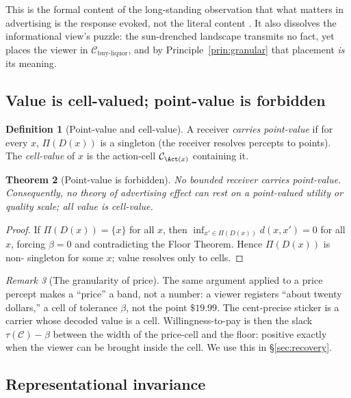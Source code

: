 \documentclass[twocolumn,11pt,a4paper]{article}
\theoremstyle{adv}
\newtheorem{theorem}{Theorem}[section]
\theoremstyle{definition}
\newtheorem{definition}[theorem]{Definition}
\theoremstyle{remark}
\newtheorem{remark}[theorem]{Remark}
\newcommand{\Cell}{\mathcal{C}}        %
\newcommand{\Dec}{D}                   %
\newcommand{\Proj}{\Pi}                %
\newcommand{\floor}{\beta}            %
\newcommand{\tol}{\tau}               %
\newcommand{\dist}{d}
\begin{document}
This is the formal content of the long-standing observation that what
matters in advertising is the response evoked, not the literal content
\citep{krugman1965,vakratsas1999}. It also dissolves the informational
view's puzzle: the sun-drenched landscape transmits no fact, yet places
the viewer in $\Cell_{\text{buy-liquor}}$, and by
Principle~\ref{prin:granular} that placement \emph{is} its meaning.

\subsection{Value is cell-valued; point-value is forbidden}

\begin{definition}[Point-value and cell-value]
\label{def:pointvalue}
A receiver \emph{carries point-value} if for every $x$, $\Proj(\Dec(x))$
is a singleton (the receiver resolves percepts to points). The
\emph{cell-value} of $x$ is the action-cell $\Cell_{\Act(x)}$ containing
it.
\end{definition}

\begin{theorem}[Point-value is forbidden]
\label{thm:nopoint}
No bounded receiver carries point-value. Consequently, no theory of
advertising effect can rest on a point-valued utility or quality scale;
all value is cell-value.
\end{theorem}

\begin{proof}
If $\Proj(\Dec(x))=\{x\}$ for all $x$, then
$\inf_{x'\in\Proj(\Dec(x))}\dist(x,x')=0$ for all $x$, forcing $\floor=0$
and contradicting the Floor Theorem. Hence $\Proj(\Dec(x))$ is non-
singleton for some $x$; value resolves only to cells.
\end{proof}

\begin{remark}[The granularity of price]
\label{rem:price}
The same argument applied to a price percept makes a ``price'' a band, not
a number: a viewer registers ``about twenty dollars,'' a cell of tolerance
$\floor$, not the point $\$19.99$. The cent-precise sticker is a carrier
whose decoded value is a cell. Willingness-to-pay is then the slack
$\tol(\Cell)-\floor$ between the width of the price-cell and the floor:
positive exactly when the viewer can be brought inside the cell. We use
this in \S\ref{sec:recovery}.
\end{remark}

\subsection{Representational invariance}
\end{document}
